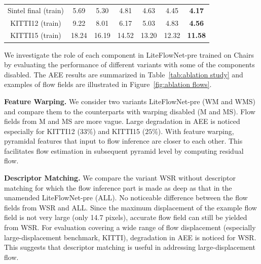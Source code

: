\documentclass[10pt,twocolumn,letterpaper]{article}
\begin{document}
\begin{table}[t]
{\begin{tabular}{|c|c|c|c|c|c|c|}
\multicolumn{1}{|c||}{Sintel final (train)}
&\multicolumn{1}{c|}{5.69}
&\multicolumn{1}{c|}{5.30}
&\multicolumn{1}{c|}{4.81}
&\multicolumn{1}{c|}{4.63}
&\multicolumn{1}{c||}{4.45}
&\multicolumn{1}{c|}{\textbf{4.17}} \\

\multicolumn{1}{|c||}{KITTI12 (train)}
&\multicolumn{1}{c|}{9.22}
&\multicolumn{1}{c|}{8.01}
&\multicolumn{1}{c|}{6.17}
&\multicolumn{1}{c|}{5.03}
&\multicolumn{1}{c||}{4.83}
&\multicolumn{1}{c|}{\textbf{4.56}} \\

\multicolumn{1}{|c||}{KITTI15 (train)}
&\multicolumn{1}{c|}{18.24}
&\multicolumn{1}{c|}{16.19}
&\multicolumn{1}{c|}{14.52}
&\multicolumn{1}{c|}{13.20}
&\multicolumn{1}{c||}{12.32}
&\multicolumn{1}{c|}{\textbf{11.58}} \\
\hline 
\end{tabular}}
\end{table}
%
We investigate the role of each component in LiteFlowNet-pre trained on Chairs by evaluating the performance of different variants with some of the components disabled. The AEE results are summarized in Table~\ref{tab:ablation study} and examples of flow fields are illustrated in Figure~\ref{fig:ablation flows}. 

\vspace{0.1cm}
\noindent
\textbf{Feature Warping.} We consider two variants LiteFlowNet-pre (WM and WMS) and compare them to the counterparts with warping disabled (M and MS). Flow fields from M and MS are more vague. Large degradation in AEE is noticed especially for KITTI12 ($33\%$) and KITTI15 ($25\%$). With feature warping, pyramidal features that input to flow inference are closer to each other. This facilitates flow estimation in subsequent pyramid level by computing residual flow.

\vspace{0.1cm}
\noindent
\textbf{Descriptor Matching.} We compare the variant WSR without descriptor matching for which the flow inference part is made as deep as that in the unamended LiteFlowNet-pre (ALL). No noticeable difference between the flow fields from WSR and ALL. Since the maximum displacement of the example flow field is not very large (only 14.7 pixels), accurate flow field can still be yielded from WSR. For evaluation covering a wide range of flow displacement (especially large-displacement benchmark, KITTI), degradation in AEE is noticed for WSR. This suggests that descriptor matching is useful in addressing large-displacement flow.   
\end{document}
